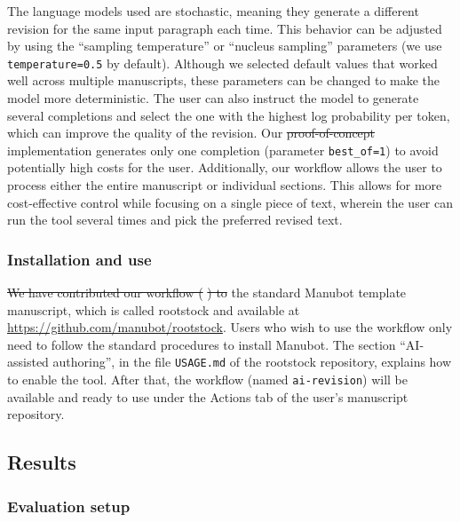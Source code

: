 \documentclass[
]{article}
\providecommand{\DIFaddtex}[1]{{\protect\color{blue}\uwave{#1}}} %
\providecommand{\DIFdeltex}[1]{{\protect\color{red}\sout{#1}}}                      %
\providecommand{\DIFaddbegin}{} %
\providecommand{\DIFaddend}{} %
\providecommand{\DIFdelbegin}{} %
\providecommand{\DIFdelend}{} %
\providecommand{\DIFadd}[1]{\texorpdfstring{\DIFaddtex{#1}}{#1}} %
\providecommand{\DIFdel}[1]{\texorpdfstring{\DIFdeltex{#1}}{}} %
\newcommand{\DIFscaledelfig}{0.5}
\newlength{\DIFdelgraphicswidth} %
\newlength{\DIFdelgraphicsheight} %
\newcommand{\DIFaddincludegraphics}[2][]{{\color{blue}\fbox{\DIFOincludegraphics[#1]{#2}}}} %
\newcommand{\DIFdelincludegraphics}[2][]{%
\sbox{\DIFdelgraphicsbox}{\DIFOincludegraphics[#1]{#2}}%
\settoboxwidth{\DIFdelgraphicswidth}{\DIFdelgraphicsbox} %
\settoboxtotalheight{\DIFdelgraphicsheight}{\DIFdelgraphicsbox} %
\scalebox{\DIFscaledelfig}{%
\parbox[b]{\DIFdelgraphicswidth}{\usebox{\DIFdelgraphicsbox}\\[-\baselineskip] \rule{\DIFdelgraphicswidth}{0em}}\llap{\resizebox{\DIFdelgraphicswidth}{\DIFdelgraphicsheight}{%
\setlength{\unitlength}{\DIFdelgraphicswidth}%
\begin{picture}(1,1)%
\thicklines\linethickness{2pt} %
{\color[rgb]{1,0,0}\put(0,0){\framebox(1,1){}}}%
{\color[rgb]{1,0,0}\put(0,0){\line( 1,1){1}}}%
{\color[rgb]{1,0,0}\put(0,1){\line(1,-1){1}}}%
\end{picture}%
}\hspace*{3pt}}} %
} %
\DeclareRobustCommand{\DIFaddbegin}{\DIFOaddbegin \let\includegraphics\DIFaddincludegraphics} %
\DeclareRobustCommand{\DIFaddend}{\DIFOaddend \let\includegraphics\DIFOincludegraphics} %
\DeclareRobustCommand{\DIFdelbegin}{\DIFOdelbegin \let\includegraphics\DIFdelincludegraphics} %
\DeclareRobustCommand{\DIFdelend}{\DIFOaddend \let\includegraphics\DIFOincludegraphics} %
\begin{document}
The language models used are stochastic, meaning they generate a different revision for the same input paragraph each time.
This behavior can be adjusted by using the ``sampling temperature'' or ``nucleus sampling'' parameters (we use \texttt{temperature=0.5} by default).
Although we selected default values that worked well across multiple manuscripts, these parameters can be changed to make the model more deterministic.
The user can also instruct the model to generate several completions and select the one with the highest log probability per token, which can improve the quality of the revision.
Our \DIFdelbegin \DIFdel{proof-of-concept }\DIFdelend implementation generates only one completion (parameter \texttt{best\_of=1}) to avoid potentially high costs for the user.
Additionally, our workflow allows the user to process either the entire manuscript or individual sections.
This allows for more cost-effective control while focusing on a single piece of text, wherein the user can run the tool several times and pick the preferred revised text.

\hypertarget{installation-and-use}{%
\subsubsection{Installation and use}\label{installation-and-use}}

\DIFdelbegin \DIFdel{We have contributed our workflow (}%
\DIFdel{) to }\DIFdelend \DIFaddbegin \DIFadd{The Manubot AI Editor is part of }\DIFaddend the standard Manubot template manuscript, which is called rootstock and available at \url{https://github.com/manubot/rootstock}.
Users who wish to use the workflow only need to follow the standard procedures to install Manubot.
The section ``AI-assisted authoring'', in the file \texttt{USAGE.md} of the rootstock repository, explains how to enable the tool.
After that, the workflow (named \texttt{ai-revision}) will be available and ready to use under the Actions tab of the user's manuscript repository.

\hypertarget{sec:results}{%
\subsection{Results}\label{sec:results}}

\hypertarget{evaluation-setup}{%
\subsubsection{Evaluation setup}\label{evaluation-setup}}
\end{document}
